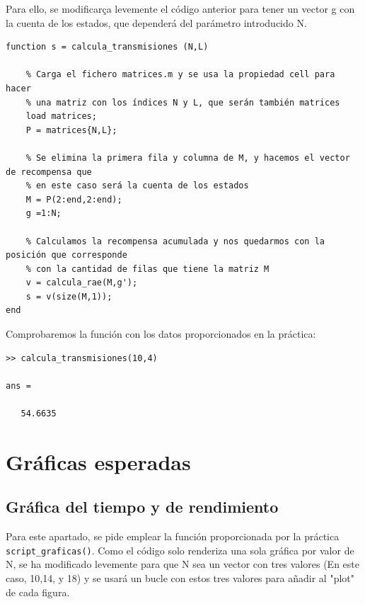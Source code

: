 \documentclass{article}
\begin{document}
Para ello, se modificarça levemente el código anterior para tener un vector g con la cuenta de los estados, que dependerá del parámetro introducido N.

\begin{verbatim}
function s = calcula_transmisiones (N,L)

    % Carga el fichero matrices.m y se usa la propiedad cell para hacer
    % una matriz con los índices N y L, que serán también matrices
    load matrices;
    P = matrices{N,L};

    % Se elimina la primera fila y columna de M, y hacemos el vector de recompensa que 
    % en este caso será la cuenta de los estados
    M = P(2:end,2:end);
    g =1:N; 

    % Calculamos la recompensa acumulada y nos quedarmos con la posición que corresponde
    % con la cantidad de filas que tiene la matriz M
    v = calcula_rae(M,g');
    s = v(size(M,1)); 
end
\end{verbatim}

Comprobaremos la función con los datos proporcionados en la práctica:

\begin{verbatim}
>> calcula_transmisiones(10,4)

ans =

   54.6635
\end{verbatim}

\section{Gráficas esperadas}

\subsection{Gráfica del tiempo y de rendimiento}

Para este apartado, se pide emplear la función proporcionada por la práctica \verb|script_graficas()|. Como el código solo renderiza una sola gráfica por valor de N, se ha modificado levemente para que N sea un vector con tres valores (En este caso, 10,14, y 18) y se usará un bucle con estos tres valores para añadir al "plot" de cada figura.
\end{document}
